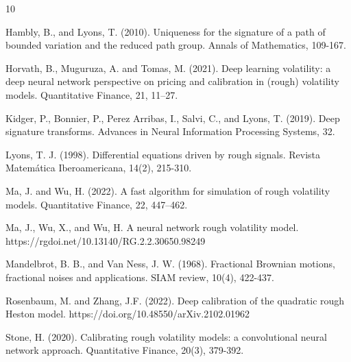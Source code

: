 \documentclass[]{article}
\renewcommand{\(}{\left(}
\renewcommand{\)}{\right)}
\begin{document}
	\begin{thebibliography}{10}

		Hambly, B., and Lyons, T. (2010). Uniqueness for the signature of a path of bounded variation and the reduced path group. Annals of Mathematics, 109-167.
		
		Horvath, B., Muguruza, A. and Tomas, M. (2021). Deep learning volatility: a deep neural network perspective on pricing and calibration in (rough) volatility models. Quantitative Finance, 21, 11--27.
		
		Kidger, P., Bonnier, P., Perez Arribas, I., Salvi, C., and Lyons, T. (2019). Deep signature transforms. Advances in Neural Information Processing Systems, 32.
		
		Lyons, T. J. (1998). Differential equations driven by rough signals. Revista Matemática Iberoamericana, 14(2), 215-310.
		
		Ma, J. and Wu, H. (2022). A fast algorithm for simulation of rough volatility models. Quantitative Finance, 22, 447--462.
		
		Ma, J., Wu, X., and Wu, H. A neural network rough volatility model. https://rgdoi.net/10.13140/RG.2.2.30650.98249
		
		Mandelbrot, B. B., and Van Ness, J. W. (1968). Fractional Brownian motions, fractional noises and applications. SIAM review, 10(4), 422-437.
		
		Rosenbaum, M. and Zhang, J.F. (2022). Deep calibration of the quadratic rough Heston model.
		https://doi.org/10.48550/arXiv.2102.01962
		
		Stone, H. (2020). Calibrating rough volatility models: a convolutional neural network approach. Quantitative Finance, 20(3), 379-392.
		

\end{thebibliography}
\end{document}
